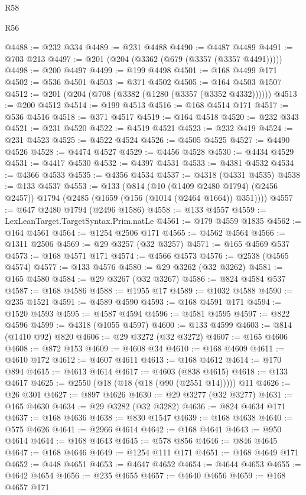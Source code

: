 \begin{lexlean}{R58}
\begin{lexlean}{R56}
\begin{coremodule}
{{{{{{{{{{{{{{{{{{{{{{{{{{{{{{{{{{{{{{{{{{{{{{{{{{{{{{{{{{{{{{{{{{{{{{{{{{{{{{{{{{{{{{{{{{{{{{{{{{{{{{{{{{{{{{{{{{{{{{{{{{{{{{{{{{{{{{{{{{{{{{{{{{{{{{{{{{{{{{{{{{{{{{{{{{{{{{{{{{{{{{{{{{{{{{{{{{{{{{{{{{{{{{{{{{{@4488 := @232 @334
@4489 := @231 @4488
@4490 := @4487 @4489
@4491 := @703 @213
@4497 := @201 (@204 (@3362 (@679 (@3357 (@3357 @4491)))))
@4498 := @200 @4497
@4499 := @199 @4498
@4501 := @168 @4499 @171
@4502 := @536 @4501
@4503 := @371 @4502
@4505 := @164 @4503 @1507
@4512 := @201 (@204 (@708 (@3382 (@1280 (@3357 (@3352 @4332))))))
@4513 := @200 @4512
@4514 := @199 @4513
@4516 := @168 @4514 @171
@4517 := @536 @4516
@4518 := @371 @4517
@4519 := @164 @4518
@4520 := @232 @343
@4521 := @231 @4520
@4522 := @4519 @4521
@4523 := @232 @419
@4524 := @231 @4523
@4525 := @4522 @4524
@4526 := @4505 @4525
@4527 := @4490 @4526
@4528 := @4474 @4527
@4529 := @4456 @4528
@4530 := @4434 @4529
@4531 := @4417 @4530
@4532 := @4397 @4531
@4533 := @4381 @4532
@4534 := @4366 @4533
@4535 := @4356 @4534
@4537 := @4318 (@4331 @4535)
@4538 := @133 @4537
@4553 := @133
    (@814
      (@10 (@1409 @2480 @1794) (@2456 @2457))
      @1794
      (@2485 (@1659 (@156 (@1014 (@2464 @1664)) @351))))
@4557 := @647 @2480 @1794 (@2496 @1586)
@4558 := @133 @4557
@4559 := LexLeanTarget.TargetSyntax.Prim.natLe
@4561 := @179 @4559 @1835
@4562 := @164 @4561
@4564 := @1254 @2506 @171
@4565 := @4562 @4564
@4566 := @1311 @2506
@4569 := @29 @3257 (@32 @3257)
@4571 := @165 @4569 @537
@4573 := @168 @4571 @171
@4574 := @4566 @4573
@4576 := @2538 (@4565 @4574)
@4577 := @133 @4576
@4580 := @29 @3262 (@32 @3262)
@4581 := @165 @4580
@4584 := @29 @3267 (@32 @3267)
@4586 := @824 @4584 @537
@4587 := @168 @4586
@4588 := @1955 @17
@4589 := @1032 @4588
@4590 := @235 @1521
@4591 := @4589 @4590
@4593 := @168 @4591 @171
@4594 := @1520 @4593
@4595 := @4587 @4594
@4596 := @4581 @4595
@4597 := @822 @4596
@4599 := @4318 (@1055 @4597)
@4600 := @133 @4599
@4603 := @814 (@1410 @92) @820
@4606 := @29 @3272 (@32 @3272)
@4607 := @165 @4606
@4608 := @872 @153
@4609 := @4608 @34
@4610 := @168 @4609
@4611 := @4610 @172
@4612 := @4607 @4611
@4613 := @168 @4612
@4614 := @170 @894
@4615 := @4613 @4614
@4617 := @4603 (@838 @4615)
@4618 := @133 @4617
@4625 := @2550 (@18 (@18 (@18 (@90 (@2551 @14))))) @11
@4626 := @26 @301
@4627 := @897 @4626
@4630 := @29 @3277 (@32 @3277)
@4631 := @165 @4630
@4634 := @29 @3282 (@32 @3282)
@4636 := @824 @4634 @171
@4637 := @168 @4636
@4638 := @830 @1547
@4639 := @168 @4638
@4640 := @575 @4626
@4641 := @2966 @4614
@4642 := @168 @4641
@4643 := @950 @4614
@4644 := @168 @4643
@4645 := @578 @856
@4646 := @846 @4645
@4647 := @168 @4646
@4649 := @1254 @111 @171
@4651 := @168 @4649 @171
@4652 := @448 @4651
@4653 := @4647 @4652
@4654 := @4644 @4653
@4655 := @4642 @4654
@4656 := @235 @4655
@4657 := @4640 @4656
@4659 := @168 @4657 @171
}}}}}}}}}}}}}}}}}}}}}}}}}}}}}}}}}}}}}}}}}}}}}}}}}}}}}}}}}}}}}}}}}}}}}}}}}}}}}}}}}}}}}}}}}}}}}}}}}}}}}}}}}}}}}}}}}}}}}}}}}}}}}}}}}}}}}}}}}}}}}}}}}}}}}}}}}}}}}}}}}}}}}}}}}}}}}}}}}}}}}}}}}}}}}}}}}}}}}}}}}}}}}}}}}}}
\end{coremodule}
\end{lexlean}
\end{lexlean}
